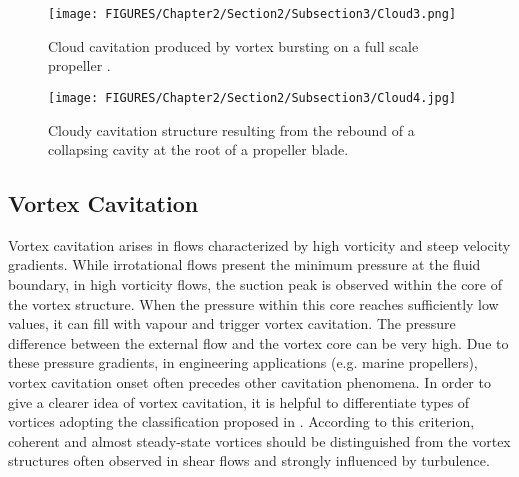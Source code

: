 \begin{figure}[h!]
    \centering
    \begin{minipage}{0.45\textwidth}
        \centering
        \texttt{[image: FIGURES/Chapter2/Section2/Subsection3/Cloud3.png]}  
        \caption{Cloud cavitation produced by vortex bursting on a full scale propeller \cite{carlton2018marine}.}
        \label{fig:Cloud3}
    \end{minipage}
    \hfill
    \begin{minipage}{0.45\textwidth}
        \centering
        \texttt{[image: FIGURES/Chapter2/Section2/Subsection3/Cloud4.jpg]}  
        \caption{Cloudy cavitation structure resulting from the rebound of a collapsing cavity at the root of a propeller blade.}
        \label{fig:Cloud4}
    \end{minipage}
\end{figure}

\subsection{Vortex Cavitation}

Vortex cavitation arises in flows characterized by high vorticity and steep velocity gradients. While irrotational flows present the minimum pressure at the fluid boundary, in high vorticity flows, the suction peak is observed within the core of the vortex structure. When the pressure within this core reaches sufficiently low values, it can fill with vapour and trigger vortex cavitation.
The pressure difference between the external flow and the vortex core can be very high. Due to these pressure gradients, in engineering applications (e.g. marine propellers), vortex cavitation onset often precedes other cavitation phenomena.
In order to give a clearer idea of vortex cavitation, it is helpful to differentiate types of vortices adopting the classification proposed in \cite{franc2006fundamentals}. 
According to this criterion, coherent and almost steady-state vortices should be distinguished from the vortex structures often observed in shear flows and strongly influenced by turbulence.

